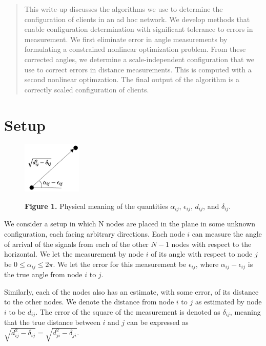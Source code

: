 \documentclass[12pt]{article}
\begin{document}
\maketitle

\begin{abstract}
This write-up discusses the algorithms we use to determine the configuration of clients in an ad hoc network. We develop methods that enable configuration determination with significant tolerance to errors in measurement. We first eliminate error in angle measurements by formulating a constrained nonlinear optimization problem. From these corrected angles, we determine a scale-independent configuration that we use to correct errors in distance measurements. This is computed with a second nonlinear optimzation. The final output of the algorithm is a correctly scaled configuration of clients. 
\end{abstract}

\section{Setup}
\begin{figure} %
    \centering
    \includegraphics[width=0.25\textwidth]{figure1}

\footnotesize{\textbf{Figure 1.} Physical meaning of the quantities $\alpha_{ij}$, $\epsilon_{ij}$, $d_{ij}$, and $\delta_{ij}$.}

\end{figure}

We consider a setup in which N nodes are placed in the plane in some unknown configuration, each facing arbitrary directions. Each node $i$ can measure the angle of arrival of the signals from each of the other $N -1$ nodes with respect to the horizontal. We let the measurement by node $i$ of its angle with respect to node $j$ be $ 0 \le \alpha_{ij} \le 2\pi$. We let the error for this measurement be $\epsilon_{ij}$, where $\alpha_{ij} - \epsilon_{ij}$ is the true angle from node $i$ to $j$.

Similarly, each of the nodes also has an estimate, with some error, of its distance to the other nodes. We denote the distance from node $i$ to $j$ as estimated by node $i$ to be $d_{ij}$. The error of the square of the measurement is denoted as $\delta_{ij}$, meaning that the true distance between $i$ and $j$ can be expressed as $\sqrt{d_{ij}^2 - \delta_{ij}} = \sqrt{d_{ji}^2 - \delta_{ji}}$.
\end{document}
